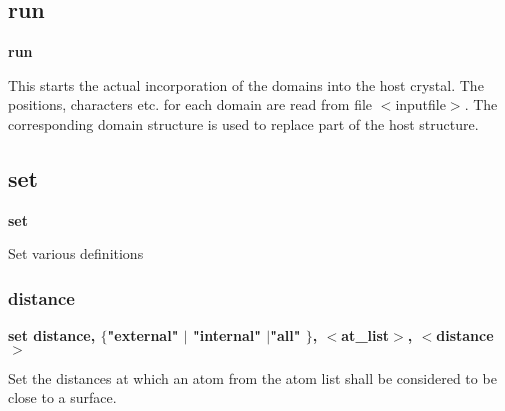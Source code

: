\subsection*{run}
{\bf run \par }
\par
\vspace{3pt}
This starts the actual incorporation of the domains into the host 
crystal. The positions, characters etc. for each domain are read 
from file $ <$inputfile$> $. The corresponding domain structure is used to 
replace part of the host structure. 
\subsection*{set}
{\bf set \par }
\par
\vspace{3pt}
Set various definitions 
\par
\subsubsection{distance}
{\bf set distance, $ \{$"external" $| $ "internal" $| $"all" $\} $, $ <$at\_list$> $, $ <$distance$> $ \par }
\par
\vspace{3pt}
Set the distances at which an atom from the atom list shall be 
considered to be close to a surface. 
